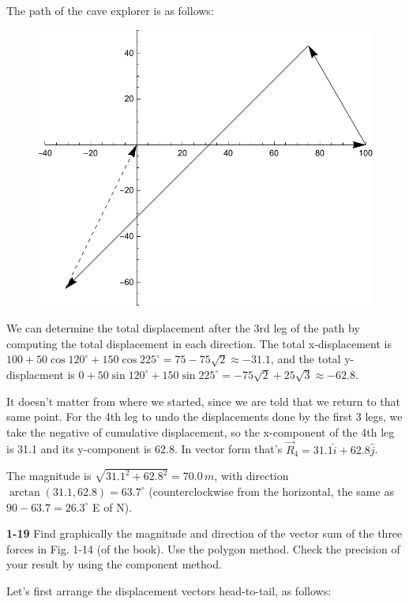 \documentclass{amsart}
\begin{document}
The path of the cave explorer is as follows:

\begin{figure}[h]
\includegraphics[scale=0.32]{1-18}
\end{figure}

We can determine the total displacement after the 3rd leg of the path by computing the total displacement in each direction.
The total x-displacement is $100 + 50 \cos 120^\circ + 150 \cos 225^\circ = 75 - 75 \sqrt{2} \approx -31.1$,
and the total y-displacment is $0 + 50 \sin 120^\circ + 150 \sin 225^\circ = -75 \sqrt{2} +25 \sqrt{3} \approx -62.8$.

It doesn't matter from where we started, since we are told that we return to that same point.
For the 4th leg to undo the displacements done by the first 3 legs,
we take the negative of cumulative displacement,
so the x-component of the 4th leg is 31.1 and its y-component is 62.8.
In vector form that's $\vec R_4 = 31.1 \hat i + 62.8 \hat j$.

The magnitude is $\sqrt{31.1^2+62.8^2} = 70.0\,m$, with direction $\arctan(31.1, 62.8) = 63.7^\circ$
(counterclockwise from the horizontal, the same as $90 - 63.7 = 26.3^\circ$ E of N).

\textbf{1-19} Find graphically the magnitude and direction of the vector sum of the three forces in Fig. 1-14 (of the book).
Use the polygon method.
Check the precision of your result by using the component method.

Let's first arrange the displacement vectors head-to-tail, as follows:
\end{document}
